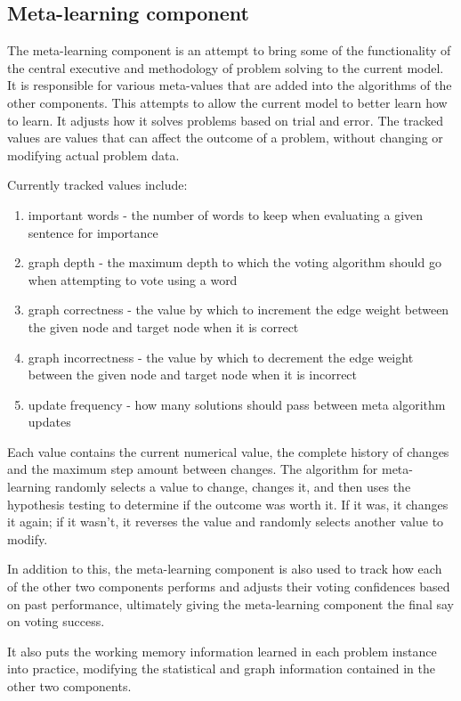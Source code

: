 \subsection{Meta-learning component} 

The meta-learning component is an attempt
to bring some of the functionality of the central executive and methodology of
problem solving to the current model. It is responsible for various meta-values
that are added into the algorithms of the other components.  This attempts to 
allow the current model to better learn how to learn. It adjusts how it  
solves problems based on trial and error. The tracked values are values that can affect 
the outcome of a problem, without changing or modifying actual problem data.

Currently tracked values include:

\begin{enumerate}     
	\item important words - the number of words to keep when evaluating a given 
	sentence for importance     
	\item graph depth - the maximum depth to which the voting algorithm should go when 
	attempting to vote using a word 
	\item graph correctness - the value by which to increment the edge weight 
	between the given node and target node when it is correct     
	\item graph incorrectness - the value by which to decrement the edge weight 
	between the given node and target node when it is incorrect     
	\item update frequency - how many solutions should pass between meta 
	algorithm updates 
\end{enumerate}

Each value contains the current numerical value, the complete history of changes
and the maximum step amount between changes.  The algorithm for meta-learning 
randomly selects a value to change, changes it, and then uses the hypothesis
testing to determine if the outcome was worth it. If it was, it changes it again; 
if it wasn't, it reverses the value and randomly selects another value to
modify.

In addition to this, the meta-learning component is also used to track how each
of the other two components performs and adjusts their voting confidences
based on past performance, ultimately giving the meta-learning component the final
say on voting success.

It also puts the working memory information learned in each problem instance
into practice, modifying the statistical and graph information contained in the
other two components.

